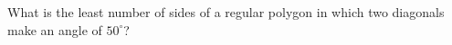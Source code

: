 What is the least number of sides of a regular polygon in which two diagonals make an angle of $50^\circ$?
